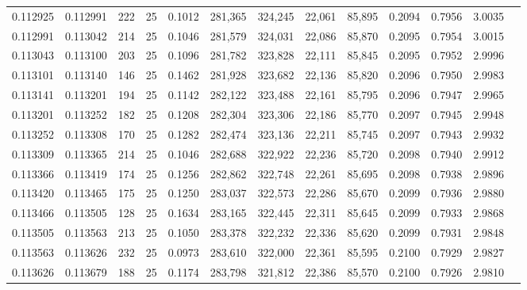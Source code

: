 \begin{tabular}{rrrrrrrrrrrrr}
0.112925 & 0.112991 &   222 &  25 &                                     0.1012 & 281,365 & 324,245 &  22,061 &  85,895 & 0.2094 & 0.7956 & 3.0035 \\
0.112991 & 0.113042 &   214 &  25 &                                     0.1046 & 281,579 & 324,031 &  22,086 &  85,870 & 0.2095 & 0.7954 & 3.0015 \\
0.113043 & 0.113100 &   203 &  25 &                                     0.1096 & 281,782 & 323,828 &  22,111 &  85,845 & 0.2095 & 0.7952 & 2.9996 \\
0.113101 & 0.113140 &   146 &  25 &                                     0.1462 & 281,928 & 323,682 &  22,136 &  85,820 & 0.2096 & 0.7950 & 2.9983 \\
0.113141 & 0.113201 &   194 &  25 &                                     0.1142 & 282,122 & 323,488 &  22,161 &  85,795 & 0.2096 & 0.7947 & 2.9965 \\
0.113201 & 0.113252 &   182 &  25 &                                     0.1208 & 282,304 & 323,306 &  22,186 &  85,770 & 0.2097 & 0.7945 & 2.9948 \\
0.113252 & 0.113308 &   170 &  25 &                                     0.1282 & 282,474 & 323,136 &  22,211 &  85,745 & 0.2097 & 0.7943 & 2.9932 \\
0.113309 & 0.113365 &   214 &  25 &                                     0.1046 & 282,688 & 322,922 &  22,236 &  85,720 & 0.2098 & 0.7940 & 2.9912 \\
0.113366 & 0.113419 &   174 &  25 &                                     0.1256 & 282,862 & 322,748 &  22,261 &  85,695 & 0.2098 & 0.7938 & 2.9896 \\
0.113420 & 0.113465 &   175 &  25 &                                     0.1250 & 283,037 & 322,573 &  22,286 &  85,670 & 0.2099 & 0.7936 & 2.9880 \\
0.113466 & 0.113505 &   128 &  25 &                                     0.1634 & 283,165 & 322,445 &  22,311 &  85,645 & 0.2099 & 0.7933 & 2.9868 \\
0.113505 & 0.113563 &   213 &  25 &                                     0.1050 & 283,378 & 322,232 &  22,336 &  85,620 & 0.2099 & 0.7931 & 2.9848 \\
0.113563 & 0.113626 &   232 &  25 &                                     0.0973 & 283,610 & 322,000 &  22,361 &  85,595 & 0.2100 & 0.7929 & 2.9827 \\
0.113626 & 0.113679 &   188 &  25 &                                     0.1174 & 283,798 & 321,812 &  22,386 &  85,570 & 0.2100 & 0.7926 & 2.9810 \\

\end{tabular}

